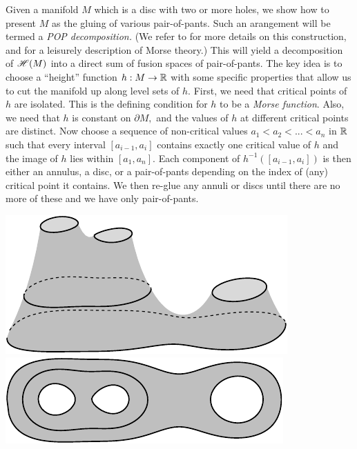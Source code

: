 \documentclass[aps, prl, letterpaper, twocolumn, superscriptaddress, notitlepage, 10pt]{revtex4-1}
\begin{document}
Given a manifold $M$ which is
a disc with two or more holes, 
we show how to present $M$ as the gluing of various
pair-of-pants. Such an arangement will be termed a \emph{POP decomposition.}
(We refer to \cite{Ivanov2001} for more details on this construction,
and \cite{Ghrist2014} for a leisurely description of Morse theory.)
This will yield a decomposition of $\mathscr{H}(M)$ into a direct
sum of fusion spaces of pair-of-pants. %
The key idea is to choose a ``height'' function $h:M\to\mathbb{R}$
with some specific properties that allow us to
cut the manifold up along level sets of $h.$
First, we need that critical points of $h$ are isolated.
This is the defining condition for $h$ to be a \emph{Morse function}.
Also, we need that $h$ is constant on $\partial M,$
and the values of $h$ at different critical points are distinct.
Now choose a sequence of non-critical values $a_1<a_2<...<a_n$ in $\mathbb{R}$
such that every interval $[a_{i-1}, a_i]$ 
contains exactly one critical value of $h$ and the image
of $h$ lies within $[a_1, a_n].$
Each component of $h^{-1}([a_{i-1}, a_i])$ is then either
an annulus, a disc, or a pair-of-pants depending on the index of (any)
critical point it contains.
We then re-glue any annuli or discs until there are no more of these
and we have only pair-of-pants. 
\begin{center}
\includegraphics[]{pic-pants.pdf}\ \ \ \ \ \ \ \ \includegraphics[]{pic-pants-1.pdf}
\end{center}
\end{document}
